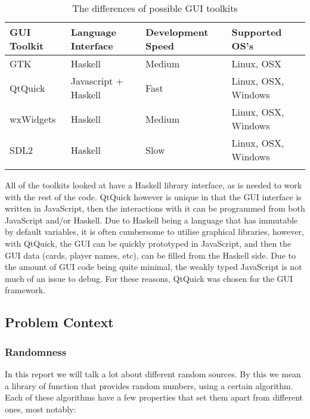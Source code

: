 \begin{table}[H]
    \begin{adjustbox}{center}
    \begin{tabular}{l l l}
    \toprule
    GUI Toolkit & Language Interface    & Development Speed & Supported OS's        \\
    \midrule
    GTK         & Haskell               & Medium            & Linux, OSX            \\ \addlinespace
    QtQuick     & Javascript + Haskell  & Fast              & Linux, OSX, Windows   \\ \addlinespace
    wxWidgets   & Haskell               & Medium            & Linux, OSX, Windows   \\ \addlinespace
    SDL2        & Haskell               & Slow              & Linux, OSX, Windows   \\ \addlinespace
    \bottomrule
    \end{tabular}
    \end{adjustbox}
    \caption{The differences of possible GUI toolkits}
\end{table}

All of the toolkits looked at have a Haskell library interface, as is needed
to work with the rest of the code. QtQuick however is unique in that the GUI
interface is written in JavaScript, then the interactions with it can be
programmed from both JavaScript and/or Haskell. Due to Haskell being a language
that has immutable by default variables, it is often cumbersome to utilise
graphical libraries, however, with QtQuick, the GUI can be quickly prototyped
in JavaScript, and then the GUI data (cards, player names, etc), can be filled
from the Haskell side. Due to the amount of GUI code being quite minimal, the
weakly typed JavaScript is not much of an issue to debug. For these reasons,
QtQuick was chosen for the GUI framework.

\subsection{Problem Context}

\subsubsection{Randomness}
In this report we will talk a lot about different random sources. By this we
mean a library of function that provides random numbers, using a certain
algorithm. Each of these algorithms have a few properties that set them apart
from different ones, most notably:

